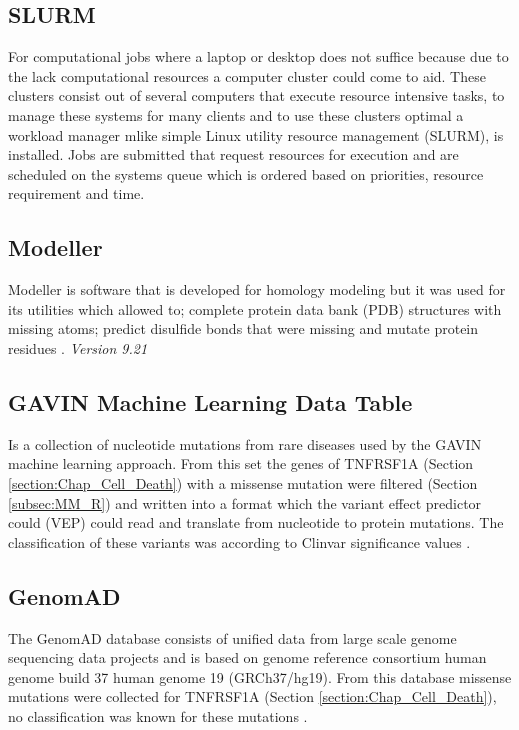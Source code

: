 \subsection{SLURM}
For computational jobs where a laptop or desktop does not suffice because due to the lack computational resources a computer cluster could come to aid. These clusters consist out of several computers that execute resource intensive tasks, to manage these systems for many clients and to use these clusters optimal a workload manager mlike simple Linux utility resource management (SLURM), is installed. Jobs are submitted that request resources for execution and are scheduled on the systems queue which is ordered based on priorities, resource requirement and time.
\label{subsec:MM_SLURM}

\subsection{Modeller}
Modeller is software that is developed for homology modeling but it was used for its utilities which allowed to; complete protein data bank (PDB) structures with missing atoms; predict disulfide bonds that were missing and mutate protein residues \cite{}. 
\label{subsec:MM_Modeller}
\newline
\textit{Version 9.21}

\subsection{GAVIN Machine Learning Data Table}
Is a collection of nucleotide mutations from rare diseases used by the GAVIN \cite{} machine learning approach. From this set the genes of TNFRSF1A (Section \ref{section:Chap_Cell_Death}) with a missense mutation were filtered (Section \ref{subsec:MM_R}) and written into a format which the variant effect predictor could (VEP) \cite{} could read and translate from nucleotide to protein mutations. The classification of these variants was according to Clinvar significance values \cite{}. 
\label{subsec:MM_GAVIN_data_table}

\subsection{GenomAD}
The GenomAD database consists of unified data from large scale genome sequencing data projects and is based on genome reference consortium human genome build 37 human genome 19 (GRCh37/hg19). From this database missense mutations were collected for TNFRSF1A (Section \ref{section:Chap_Cell_Death}), no classification was known for these mutations \cite{}.
\label{subsec:MM_GenomAD}

